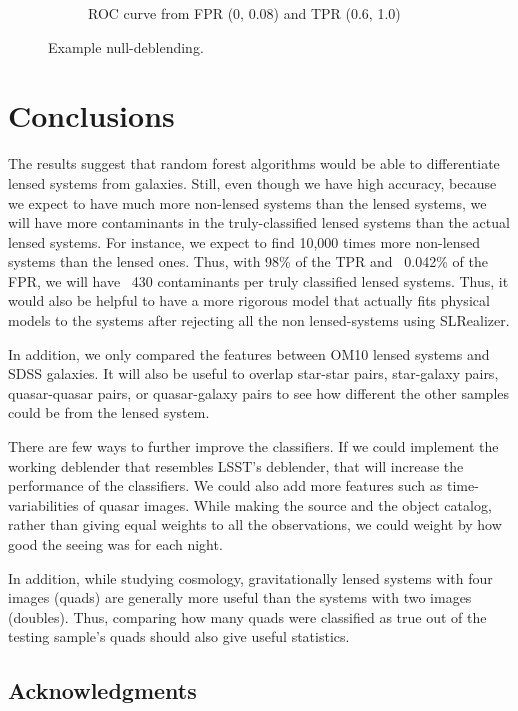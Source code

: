 \documentclass[\docopts]{\docclass}
\begin{document}
\begin{figure}
\begin{subfigure}[bt]{0.48\linewidth}
        \caption{ROC curve from FPR (0, 0.08) and TPR (0.6, 1.0)}
         \label{fig:ML Magnified}
    \end{subfigure}
    \caption{Example null-deblending.}
    \label{fig:null-deblend}
\end{figure}


\section{Conclusions}
\label{sec:conclusions}

The results suggest that random forest algorithms would be able to
differentiate lensed systems from galaxies. Still, even though we have
high accuracy, because we expect to have much more non-lensed systems
than the lensed systems, we will have more contaminants in the
truly-classified lensed systems than the actual lensed systems. For
instance, we expect to find 10,000 times more non-lensed systems than
the lensed ones. Thus, with 98\% of the TPR and ~0.042\% of the FPR, we
will have ~430 contaminants per truly classified lensed systems. Thus,
it would also be helpful to have a more rigorous model that actually
fits physical models to the systems after rejecting all the non
lensed-systems using SLRealizer.

In addition, we only compared the features between OM10 lensed systems
and SDSS galaxies. It will also be useful to overlap star-star pairs,
star-galaxy pairs, quasar-quasar pairs, or quasar-galaxy pairs to see
how different the other samples could be from the lensed system.

There are few ways to further improve the classifiers. If we could
implement the working deblender that resembles LSST’s deblender, that
will increase the performance of the classifiers. We could also add more
features such as time-variabilities of quasar images. While making the
source and the object catalog, rather than giving equal weights to all
the observations, we could weight by how good the seeing was for each
night.

In addition, while studying cosmology, gravitationally lensed systems
with four images (quads) are generally more useful than the systems with
two images (doubles). Thus, comparing how many quads were classified as
true out of the testing sample’s quads should also give useful
statistics.


\subsection*{Acknowledgments}






\end{document}
